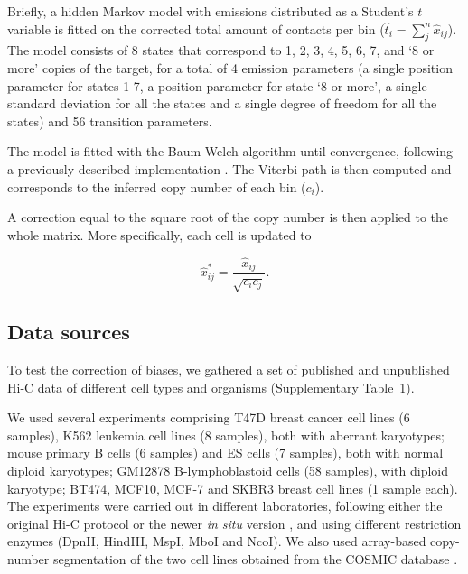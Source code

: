 \documentclass[a4,center,fleqn]{NAR}
\begin{document}
Briefly, a hidden Markov model with emissions distributed as a Student's
$t$ variable is fitted on the corrected total amount of contacts per bin
($\hat{t}_i = \sum_j^n{\hat{x}_{ij}}$). The model consists of 8 states that correspond to 1, 2, 3,
4, 5, 6, 7, and `8 or more' copies of the target, for a total of 4
emission parameters (a single position parameter for states 1-7, a
position parameter for state `8 or more', a single standard deviation for
all the states and a single degree of freedom for all the states) and 56
transition parameters. 

The model is fitted with the Baum-Welch algorithm \citep{baum1966} until
convergence, following a previously described implementation
\citep{filion2010systematic}.  The Viterbi path is then computed and
corresponds to the inferred copy number of each bin ($c_i$).

A correction equal to the square root of the copy number is then applied
to the whole matrix. More specifically, each cell is updated to

\begin{equation}
\label{eq:cnvnorm}
\hat{x}_{ij}^* = \frac{\hat{x}_{ij}}{\sqrt{c_ic_j}}.
\end{equation}


\subsection{Data sources}

To test the correction of biases, we gathered a set of
published \citep{ledily2014distinct, encode2012integrated, rao20143d,
stadhouders2017transcription, lin2012global, dixon2012topological} and
unpublished Hi-C data of different cell types and organisms
(Supplementary Table~1).

We used several experiments comprising T47D breast cancer cell lines (6
samples), K562 leukemia cell lines (8 samples), both with aberrant
karyotypes; mouse primary B cells (6 samples) and ES cells (7
samples), both with normal diploid karyotypes; GM12878 B-lymphoblastoid cells
(58 samples), with diploid karyotype; BT474, MCF10, MCF-7 and SKBR3 breast cell
lines (1 sample each). The experiments were
carried out in different laboratories, following either the original Hi-C
protocol \citep{lieberman2009comprehensive} or the newer \textit{in situ}
version \citep{rao20143d}, and using different restriction enzymes (DpnII,
HindIII, MspI, MboI and NcoI). We also used array-based copy-number
segmentation of the two cell lines obtained from the COSMIC database
\citep{forbes2010cosmic}.
\end{document}
